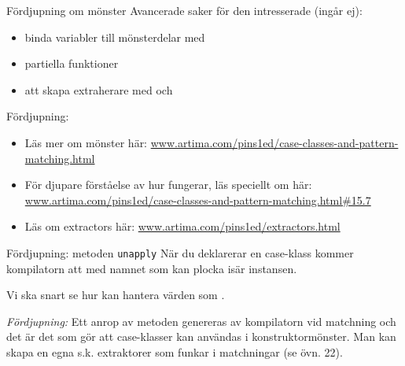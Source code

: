 \begin{Slide}{Fördjupning om mönster}
Avancerade saker för den intresserade (ingår ej):
\begin{itemize}
\item binda variabler till mönsterdelar med 
\item partiella funktioner
\item att skapa extraherare med  och 
\end{itemize}
Fördjupning:
\begin{itemize}
\item Läs mer om mönster här:  \href{http://www.artima.com/pins1ed/case-classes-and-pattern-matching.html}{\SlideFontTiny www.artima.com/pins1ed/case-classes-and-pattern-matching.html}

\item För djupare förståelse av hur  fungerar, läs speciellt om  här: \href{http://www.artima.com/pins1ed/case-classes-and-pattern-matching.html\#15.7}{\SlideFontTiny www.artima.com/pins1ed/case-classes-and-pattern-matching.html\#15.7}

\item Läs om extractors här: \href{http://www.artima.com/pins1ed/extractors.html}{\SlideFontTiny www.artima.com/pins1ed/extractors.html}

\end{itemize}
\end{Slide}


\begin{Slide}{Fördjupning: metoden \texttt{unapply}}\SlideFontSmall
När du deklarerar en case-klass kommer kompilatorn att  med namnet  som kan plocka isär instansen.
Vi ska snart se hur  kan hantera värden som  . \\
\pause

{\SlideFontTiny\vspace{1em}\emph{Fördjupning:} Ett anrop av metoden  genereras av kompilatorn vid matchning och det är det som gör att case-klasser kan användas i konstruktormönster. Man kan skapa en egna s.k. extraktorer  som funkar i matchningar (se övn. 22).}
\end{Slide}
